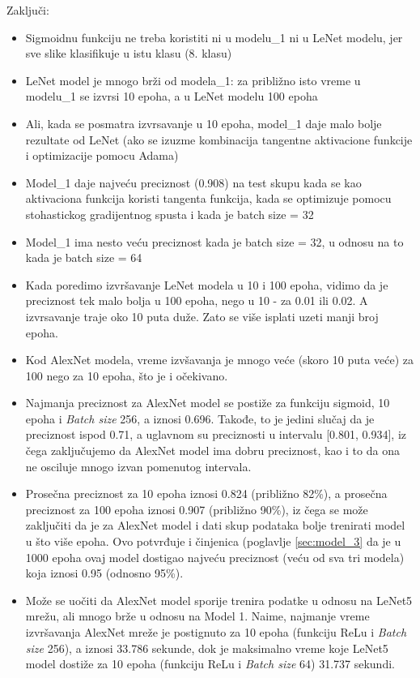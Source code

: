 \documentclass[a4paper]{article}
\begin{document}
\newpage
Zaključi:
\begin{itemize}
 \item Sigmoidnu funkciju ne treba koristiti ni u modelu\_1 ni u LeNet modelu, jer sve slike klasifikuje u istu klasu (8. klasu)
 \item LeNet model je mnogo brži od modela\_1: za približno isto vreme u modelu\_1 se izvrsi 10 epoha, a u LeNet modelu 100 epoha
 \item Ali, kada se posmatra izvrsavanje u 10 epoha, model\_1 daje malo bolje rezultate od LeNet (ako se izuzme kombinacija tangentne aktivacione funkcije i optimizacije pomocu Adama)
 \item Model\_1 daje najveću preciznost (0.908) na test skupu kada se kao aktivaciona funkcija koristi tangenta funkcija, kada se optimizuje pomocu stohastickog gradijentnog spusta i kada je batch size = 32
 \item Model\_1 ima nesto veću preciznost kada je batch size = 32, u odnosu na to kada je batch size = 64
 \item Kada poredimo izvršavanje LeNet modela u 10 i 100 epoha, vidimo da je preciznost tek malo bolja u 100 epoha, nego u 10 - za 0.01 ili 0.02. A izvrsavanje traje oko 10 puta duže. Zato se više isplati uzeti manji broj epoha.
 \item Kod AlexNet modela, vreme izvšavanja je mnogo veće (skoro 10 puta veće) za 100 nego za 10 epoha, što je i očekivano.
 \item Najmanja preciznost za AlexNet model se postiže za funkciju sigmoid, 10 epoha i \textit{Batch size} 256, a iznosi 0.696. Takođe, to je jedini slučaj da je preciznost ispod 0.71, a uglavnom su preciznosti u intervalu [0.801, 0.934], iz čega zaključujemo da AlexNet model ima dobru preciznost, kao i to da ona ne osciluje mnogo izvan pomenutog intervala.
 \item Prosečna preciznost za 10 epoha iznosi 0.824 (približno 82\%), a prosečna preciznost za 100 epoha iznosi 0.907 (približno 90\%), iz čega se može zaključiti da je za AlexNet model i dati skup podataka bolje trenirati model u što više epoha. Ovo potvrđuje i činjenica (poglavlje \ref{sec:model_3} da je u 1000 epoha ovaj model dostigao najveću preciznost (veću od sva tri modela) koja iznosi 0.95 (odnosno 95\%).
  \item Može se uočiti da AlexNet model sporije trenira podatke u odnosu na LeNet5 mrežu, ali mnogo brže u odnosu na Model 1. Naime, najmanje vreme izvršavanja AlexNet mreže je postignuto za 10 epoha (funkciju ReLu i \textit{Batch size} 256), a iznosi 33.786 sekunde, dok je maksimalno vreme koje LeNet5 model dostiže za 10 epoha (funkciju ReLu i \textit{Batch size} 64) 31.737 sekundi.
\end{itemize}
\end{document}
